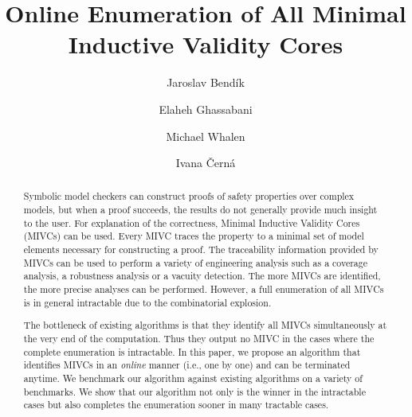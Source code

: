 \documentclass{llncs}
\begin{document}
\title{Online Enumeration of All Minimal Inductive Validity Cores}

\author{Jaroslav Bend\'ik 
	\and Elaheh Ghassabani
	\and Michael Whalen
	\and Ivana \v Cern\'a
}




\maketitle    
\begin{abstract} 
Symbolic model checkers can construct proofs of
safety properties over complex models, but when a proof succeeds,
the results do not generally provide much insight to
the user. For explanation of the correctness, Minimal Inductive Validity Cores (MIVCs) can be used. Every MIVC traces the property to a minimal set of model elements necessary
for constructing a proof. 
The traceability information provided by MIVCs can be used to perform a variety of engineering analysis such as a coverage analysis, a robustness analysis or a vacuity detection. 
The more MIVCs are identified, the more precise analyses can be performed. 
However, a full enumeration of all MIVCs
is in general intractable due to the combinatorial explosion.

The bottleneck of existing algorithms is that they identify all MIVCs simultaneously at the very end of the computation.
Thus they output no MIVC in the cases where the complete enumeration is intractable. 
In this paper, we propose an algorithm that identifies MIVCs in an \emph{online} manner (i.e., one by one)
and can be terminated anytime.
We benchmark our algorithm against existing algorithms on a variety of benchmarks. We show that our algorithm not only is the winner in the intractable cases but also completes the enumeration sooner in many tractable cases.


\end{abstract} 
 
\end{document}

